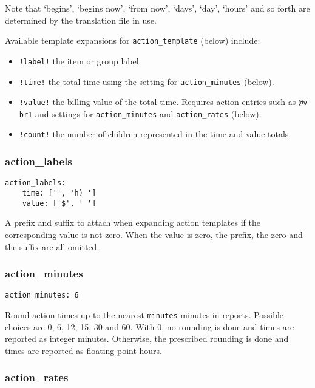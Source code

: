 \documentclass[]{article}
\begin{document}
Note that `begins', `begins now', `from now', `days', `day', `hours' and
so forth are determined by the translation file in use.

Available template expansions for \texttt{action\_template} (below)
include:

\begin{itemize}
\item
  \texttt{!label!} the item or group label.
\item
  \texttt{!time!} the total time using the setting for
  \texttt{action\_minutes} (below).
\item
  \texttt{!value!} the billing value of the total time. Requires action
  entries such as \texttt{@v br1} and settings for
  \texttt{action\_minutes} and \texttt{action\_rates} (below).
\item
  \texttt{!count!} the number of children represented in the time and
  value totals.
\end{itemize}

\subsubsection{action\_labels}

\begin{verbatim}
action_labels:
    time: ['', 'h) ']
    value: ['$', ' ']
\end{verbatim}

A prefix and suffix to attach when expanding action templates if the
corresponding value is not zero. When the value is zero, the prefix, the
zero and the suffix are all omitted.

\subsubsection{action\_minutes}

\begin{verbatim}
action_minutes: 6
\end{verbatim}

Round action times up to the nearest \texttt{minutes} minutes in
reports. Possible choices are 0, 6, 12, 15, 30 and 60. With 0, no
rounding is done and times are reported as integer minutes. Otherwise,
the prescribed rounding is done and times are reported as floating point
hours.

\subsubsection{action\_rates}
\end{document}
